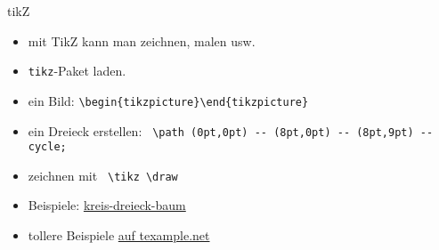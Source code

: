 \begin{frame}[fragile]{tikZ}
    \begin{itemize}[<+->]
        \item mit TikZ kann man zeichnen, malen usw.
        \item \texttt{tikz}-Paket laden.
        \item ein Bild: \lstinline|\begin{tikzpicture}\end{tikzpicture}|
        \item ein Dreieck erstellen: \lstinline| \path (0pt,0pt) -- (8pt,0pt) -- (8pt,9pt) -- cycle;|
        \item zeichnen mit \lstinline| \tikz \draw |
        \item Beispiele: \href{https://github.com/inktrap/LaTeXKurs/tree/master/5/tex/tikz}{kreis-dreieck-baum}
        \item tollere Beispiele \href{http://www.texample.net/tikz/examples/}{auf texample.net}
    \end{itemize}
\end{frame}
